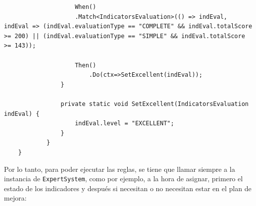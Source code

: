 \begin{itemize}
\begin{lstlisting}
                    When()
                    .Match<IndicatorsEvaluation>(() => indEval, indEval => (indEval.evaluationType == "COMPLETE" && indEval.totalScore >= 200) || (indEval.evaluationType == "SIMPLE" && indEval.totalScore >= 143));

                    Then()
                        .Do(ctx=>SetExcellent(indEval));
                }

                private static void SetExcellent(IndicatorsEvaluation indEval) {
                    indEval.level = "EXCELLENT";
                }
            }
    }
    \end{lstlisting}
\end{itemize}
Por lo tanto, para poder ejecutar las reglas, se tiene que llamar siempre a la
instancia de \texttt{ExpertSystem}, como por ejemplo, a la hora de asignar, primero el estado de los indicadores y después si necesitan o no necesitan estar en el plan de mejora:
